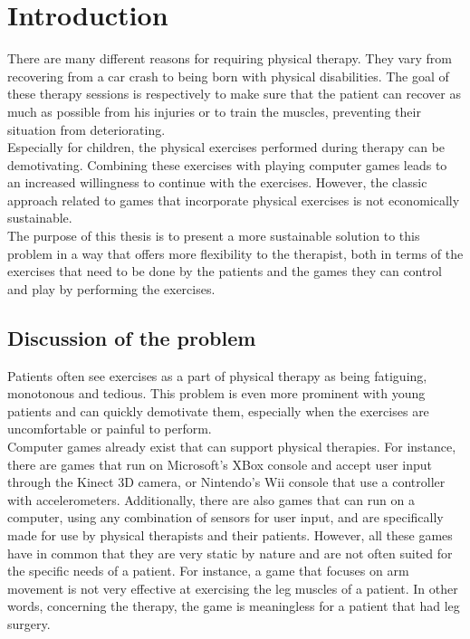 \chapter{Introduction}

There are many different reasons for requiring physical therapy. They vary from recovering from a car crash to being born with physical disabilities. The goal of these therapy sessions is respectively to make sure that the patient can recover as much as possible from his injuries or to train the muscles, preventing their situation from deteriorating.\\

Especially for children, the physical exercises performed during therapy can be demotivating. Combining these exercises with playing computer games leads to an increased willingness to continue with the exercises. However, the classic approach related to games that incorporate physical exercises is not economically sustainable.\\

The purpose of this thesis is to present a more sustainable solution to this problem in a way that offers more flexibility to the therapist, both in terms of the exercises that need to be done by the patients and the games they can control and play by performing the exercises.


\section{Discussion of the problem}

Patients often see exercises as a part of physical therapy as being fatiguing, monotonous and tedious. This problem is even more prominent with young patients and can quickly demotivate them, especially when the exercises are uncomfortable or painful to perform.\\ %

Computer games already exist that can support physical therapies. For instance, there are games that run on Microsoft's XBox console and accept user input through the Kinect 3D camera, or Nintendo's Wii console that use a controller with accelerometers. Additionally, there are also games that can run on a computer, using any combination of sensors for user input, and are specifically made for use by physical therapists and their patients. However, all these games have in common that they are very static by nature and are not often suited for the specific needs of a patient. For instance, a game that focuses on arm movement is not very effective at exercising the leg muscles of a patient. In other words, concerning the therapy, the game is meaningless for a patient that had leg surgery.\\


